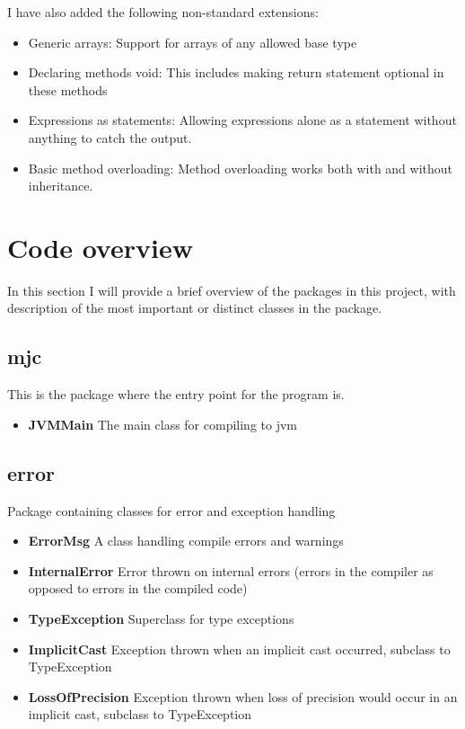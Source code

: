 \documentclass[a4paper,11pt]{article}
\begin{document}
  I have also added the following non-standard extensions:

  \begin{itemize}
     \item Generic arrays: Support for arrays of any allowed base type
     \item Declaring methods void: This includes making return statement optional in these methods
     \item Expressions as statements: Allowing expressions alone as a statement without anything to catch the output.
     \item Basic method overloading: Method overloading works both with and without inheritance.
  \end{itemize}

  \section{Code overview}
  In this section I will provide a brief overview of the packages in this project, with description of the most important or distinct classes in the package.
  \subsection{mjc}
     This is the package where the entry point for the program is.
     \begin{itemize}
        \item \textbf{JVMMain} The main class for compiling to jvm
     \end{itemize}

  \subsection{error}
     Package containing classes for error and exception handling
     \begin{itemize}
        \item \textbf{ErrorMsg} A class handling compile errors and warnings
        \item \textbf{InternalError} Error thrown on internal errors (errors in the compiler as opposed to errors in the compiled code)
        \item \textbf{TypeException} Superclass for type exceptions
        \item \textbf{ImplicitCast} Exception thrown when an implicit cast occurred, subclass to TypeException
        \item \textbf{LossOfPrecision} Exception thrown when loss of precision would occur in an implicit cast, subclass to TypeException
     \end{itemize}
\end{document}
